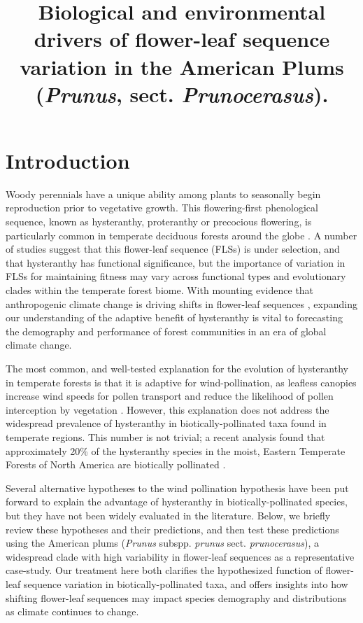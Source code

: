 \documentclass{article}[11pt]
\title{Biological and environmental drivers of flower-leaf sequence variation in the American Plums (\emph{Prunus}, sect. \emph{Prunocerasus}). }
\begin{document}

\maketitle


\section*{Introduction}
\noindent Woody perennials have a unique ability among plants to seasonally begin reproduction prior to vegetative growth. This flowering-first phenological sequence, known as hysteranthy, proteranthy or precocious flowering, is particularly common in temperate deciduous forests around the globe \citep{Rathcke_1985}. A number of studies suggest that this flower-leaf sequence (FLSs) is under selection, and that hysteranthy has functional significance, but the importance of variation in FLSs for maintaining fitness \citep{Gougherty2018,Buonaiuto2020,Guo2014} may vary across functional types and evolutionary clades within the temperate forest biome. With mounting evidence that anthropogenic climate change is driving shifts in flower-leaf sequences \citep{Ma2020:aa}, expanding our understanding of the adaptive benefit of hysteranthy is vital to forecasting the demography and performance of forest communities in an era of global climate change.

\noindent The most common, and well-tested explanation for the evolution of hysteranthy in temperate forests is that it is adaptive for wind-pollination, as leafless canopies increase wind speeds for pollen transport and reduce the likelihood of pollen interception by vegetation \citep{Whitehead1969,Niklas1985}. However, this explanation does not address the widespread prevalence of hysteranthy in biotically-pollinated taxa found in temperate regions. This number is not trivial; a recent analysis found that approximately 20\% of the hysteranthy species in the moist, Eastern Temperate Forests of North America are biotically pollinated \citep{Buonaiuto2020}. 

Several alternative hypotheses to the wind pollination hypothesis have been put forward to explain the advantage of hysteranthy in biotically-pollinated species, but they have not been widely evaluated in the literature. Below, we briefly review these hypotheses and their predictions, and then test these predictions using the American plums (\textit{Prunus} subspp. \textit{prunus} sect. \textit{prunocerasus}), a widespread clade with high variability in flower-leaf sequences as a representative case-study. Our treatment here both clarifies the hypothesized function of flower-leaf sequence variation in biotically-pollinated taxa, and offers insights into how shifting flower-leaf sequences may impact species demography and distributions as climate continues to change.
\end{document}
